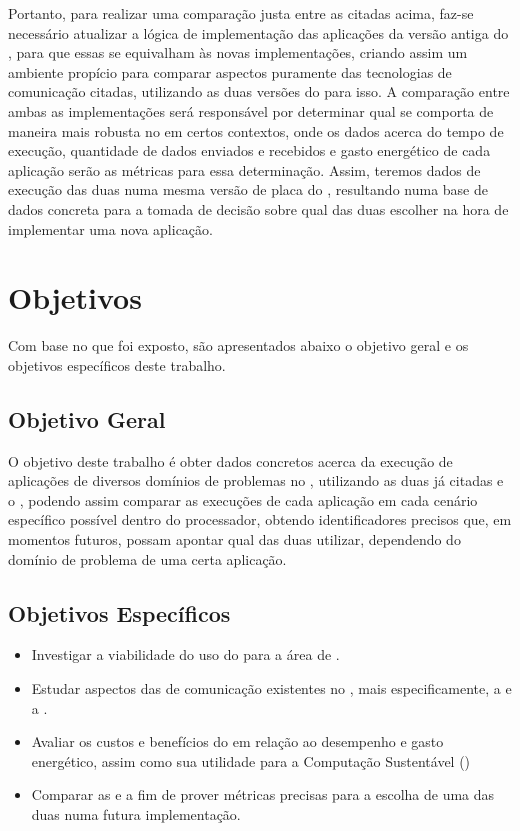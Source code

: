 Portanto, para realizar uma comparação justa entre as \APIs citadas acima, faz-se necessário atualizar a lógica de implementação das aplicações da versão antiga do \bench, para que essas se equivalham às novas implementações, criando assim um ambiente propício para comparar aspectos puramente das tecnologias de comunicação citadas, utilizando as duas versões do \bench para isso. A comparação entre ambas as implementações será responsável por determinar qual \API se comporta de maneira mais robusta no \mppa em certos contextos, onde os dados acerca do tempo de execução, quantidade de dados enviados e recebidos e gasto energético de cada aplicação serão as métricas para essa determinação. Assim, teremos dados de execução das duas \APIs numa mesma versão de placa do \mppa, resultando numa base de dados concreta para a tomada de decisão sobre qual das duas \APIs escolher na hora de implementar uma nova aplicação.

\section{Objetivos}
\label{sec:objetivos}

Com base no que foi exposto, são apresentados abaixo o objetivo geral e os objetivos específicos deste trabalho.

\subsection{Objetivo Geral}
\label{sec:objetivogeral}

O objetivo deste trabalho é obter dados concretos acerca da execução de aplicações de diversos domínios de problemas no \mppa, utilizando as duas \APIs já citadas e o \capb, podendo assim comparar as execuções de cada aplicação em cada cenário específico possível dentro do processador, obtendo identificadores precisos que, em momentos futuros, possam apontar qual das duas \APIs utilizar, dependendo do domínio de problema de uma certa aplicação.

\subsection{Objetivos Específicos}
\label{sec:objetivosespecifico}

\begin{itemize}
\item Investigar a viabilidade do uso do \mppa para a área de \HPC.
\item Estudar aspectos das \APIs de comunicação existentes no \mppa, mais especificamente, a \ASYNC e a \IPC.
\item Avaliar os custos e benefícios do \mppa em relação ao desempenho e gasto energético, assim como sua utilidade para a Computação Sustentável (\greencomputing)
\item Comparar as \APIs \ASYNC e \IPC a fim de prover métricas precisas para a escolha de uma das duas numa futura implementação.
\end{itemize}

